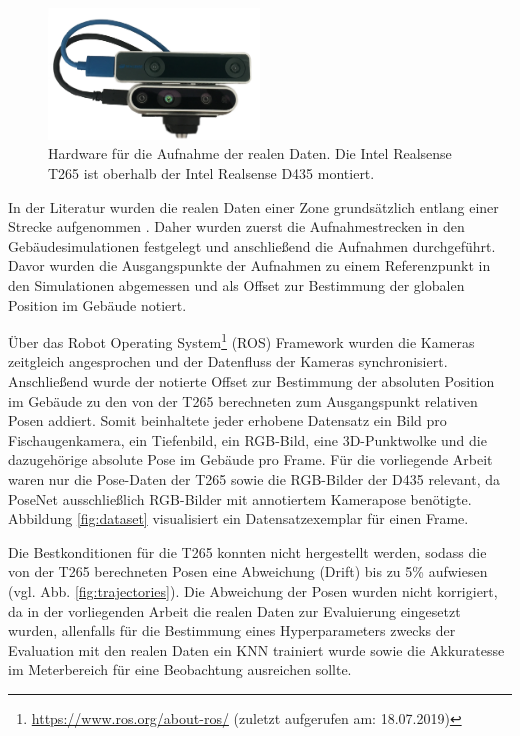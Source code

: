 \begin{figure}
	\centering
	\includegraphics[width=0.5\textwidth]{images/real_dataset/t265_d435_2.png}
	\caption{Hardware für die Aufnahme der realen Daten. Die Intel Realsense T265 ist oberhalb der Intel Realsense D435 montiert.}
	\label{fig:t265_d435}
\end{figure}

In der Literatur wurden die realen Daten einer Zone grundsätzlich entlang einer Strecke aufgenommen \cite{kendallPoseNetConvolutionalNetwork2015, clarkVidLocDeepSpatioTemporal2017, acharyaBIMPoseNetIndoorCamera2019}. Daher wurden zuerst die Aufnahmestrecken in den Gebäudesimulationen festgelegt und anschließend die Aufnahmen durchgeführt. Davor wurden die Ausgangspunkte der Aufnahmen zu einem Referenzpunkt in den Simulationen abgemessen und als Offset zur Bestimmung der globalen Position im Gebäude notiert.


Über das Robot Operating System\footnote{\url{https://www.ros.org/about-ros/} (zuletzt aufgerufen am: 18.07.2019)} (ROS) Framework wurden die Kameras zeitgleich angesprochen und der Datenfluss der Kameras synchronisiert. Anschließend wurde der notierte Offset zur Bestimmung der absoluten Position im Gebäude zu den von der T265 berechneten zum Ausgangspunkt relativen Posen addiert. Somit beinhaltete jeder erhobene Datensatz ein Bild pro Fischaugenkamera, ein Tiefenbild, ein RGB-Bild, eine 3D-Punktwolke und die dazugehörige absolute Pose im Gebäude pro Frame. Für die vorliegende Arbeit waren nur die Pose-Daten der T265 sowie die RGB-Bilder der D435 relevant, da PoseNet ausschließlich RGB-Bilder mit annotiertem Kamerapose benötigte. Abbildung \ref{fig:dataset} visualisiert ein Datensatzexemplar für einen Frame.

Die Bestkonditionen für die T265 konnten nicht hergestellt werden, sodass die von der T265 berechneten Posen eine Abweichung (Drift) bis zu 5\% aufwiesen (vgl. Abb. \ref{fig:trajectories}). Die Abweichung der Posen wurden nicht korrigiert, da in der vorliegenden Arbeit die realen Daten zur Evaluierung eingesetzt wurden, allenfalls für die Bestimmung eines Hyperparameters zwecks der Evaluation mit den realen Daten ein KNN trainiert wurde sowie die Akkuratesse im Meterbereich für eine Beobachtung ausreichen sollte.


